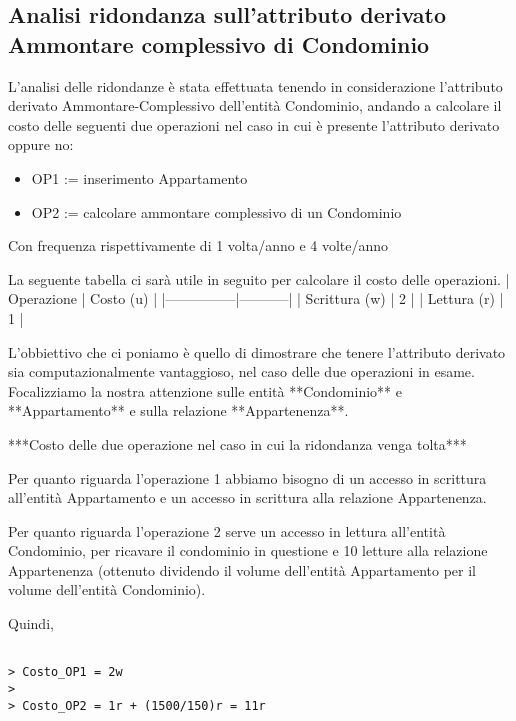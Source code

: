 \subsection{Analisi ridondanza sull'attributo derivato Ammontare complessivo di Condominio}

L'analisi delle ridondanze è stata effettuata tenendo in considerazione l'attributo derivato Ammontare-Complessivo dell'entità Condominio, andando a calcolare il costo delle seguenti due operazioni nel caso in cui è presente l'attributo derivato oppure no:

\begin{samepage}
	
\begin{itemize}
	
	\item OP1 := inserimento Appartamento
	\item OP2 := calcolare ammontare complessivo di un Condominio

\end{itemize}

\end{samepage}

Con frequenza rispettivamente di 1 volta/anno e 4 volte/anno

La seguente tabella ci sarà utile in seguito per calcolare il costo delle operazioni.
| Operazione    | Costo (u) |
|---------------|-----------|
| Scrittura (w) | 2         |
| Lettura (r)   | 1         |

L'obbiettivo che ci poniamo è quello di dimostrare che tenere l'attributo derivato sia computazionalmente vantaggioso, nel caso delle due operazioni in esame. Focalizziamo la nostra attenzione sulle entità **Condominio** e **Appartamento** e sulla relazione **Appartenenza**.

***Costo delle due operazione nel caso in cui la ridondanza venga tolta***

Per quanto riguarda l'operazione 1 abbiamo bisogno di un accesso in scrittura all'entità Appartamento e un accesso in scrittura alla relazione Appartenenza.

Per quanto riguarda l'operazione 2 serve un accesso in lettura all'entità Condominio, per ricavare il condominio in questione e 10 letture alla relazione Appartenenza (ottenuto dividendo il volume dell'entità Appartamento per il volume dell'entità Condominio).

Quindi,

\begin{verbatim}
	
> Costo_OP1 = 2w
> 
> Costo_OP2 = 1r + (1500/150)r = 11r

\end{verbatim}

